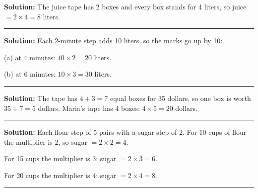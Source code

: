 \documentclass[12pt]{article}
\begin{document}



\textbf{Solution:} The juice tape has 2 boxes and every box stands for 4 liters,
so juice $= 2 \times 4 = 8$ liters. 

\vspace{0.3cm}\noindent\rule{\linewidth}{0.2pt}\vspace{0.3cm}


\textbf{Solution:} Each 2-minute step adds 10 liters, so the marks go up by 10:

(a) at 4 minutes: $10 \times 2 = 20$ liters. 

(b) at 6 minutes: $10 \times 3 = 30$ liters. 

\vspace{0.3cm}\noindent\rule{\linewidth}{0.2pt}\vspace{0.3cm}


\textbf{Solution:} The tape has $4 + 3 = 7$ equal boxes for 35 dollars, so one
box is worth $35 \div 7 = 5$ dollars. Maria's tape has 4 boxes:
$4 \times 5 = 20$ dollars. 

\vspace{0.3cm}\noindent\rule{\linewidth}{0.2pt}\vspace{0.3cm}


\textbf{Solution:} Each flour step of 5 pairs with a sugar step of 2. For 10
cups of flour the multiplier is 2, so sugar $= 2 \times 2 = 4$. 

For 15 cups the multiplier is 3: sugar $= 2 \times 3 = 6$. 

For 20 cups the multiplier is 4: sugar $= 2 \times 4 = 8$. 

\vspace{0.3cm}\noindent\rule{\linewidth}{0.2pt}\vspace{0.3cm}

\end{document}
